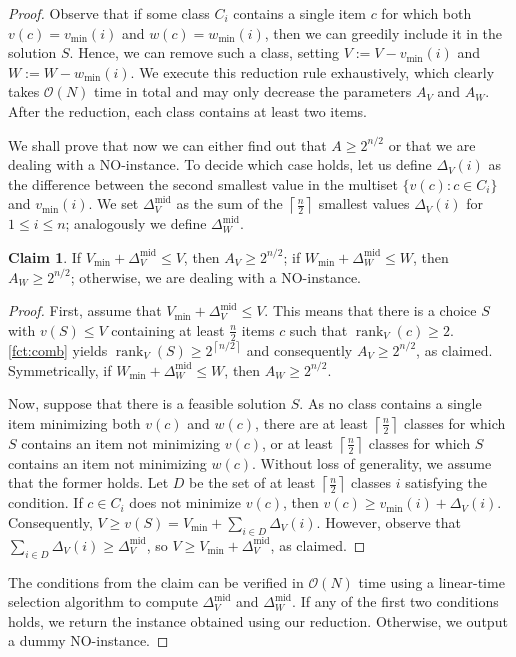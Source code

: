 \documentclass{article}
\theoremstyle{plain}
\theoremstyle{definition}
\newtheorem*{claim}{Claim}
\newcommand{\ceil}[1]{\left\lceil #1 \right\rceil}
\newcommand{\Oh}{\mathcal{O}}
\newcommand{\mmid}{\mathrm{mid}}
\DeclareMathOperator*{\rank}{rank}
\begin{document}
  \begin{proof}   
    Observe that if some class $C_i$ contains a single item $c$ for which both $v(c)=v_{\min}(i)$
    and $w(c)=w_{\min}(i)$, then we can greedily include it in the solution $S$.  
    Hence, we can remove such a class, setting $V := V- v_{\min}(i)$ and $W := W- w_{\min}(i)$.
    We execute this reduction rule exhaustively, which clearly takes $\Oh(N)$ time in total
    and may only decrease the parameters $A_V$ and $A_W$.
    After the reduction, each class contains at least two items.
    
    
    We shall prove that now we can either find out that $A \ge 2^{n/2}$ or 
    that we are dealing with a NO-instance.
    To decide which case holds, let us define $\Delta_V(i)$ as the difference between the second smallest
    value in the multiset $\{v(c) : c\in C_i\}$ and $v_{\min}(i)$.
    We set $\Delta_V^{\mmid}$ as the sum of the $\ceil{\frac{n}{2}}$ smallest values $\Delta_V(i)$
    for $1\le i \le n$; analogously we define $\Delta_W^{\mmid}$.
   
    \begin{claim}
      If $V_{\min} + \Delta_V^{\mmid} \le V$, then $A_V \ge 2^{n/2}$;
      if $W_{\min} + \Delta_W^{\mmid} \le W$, then $A_W \ge 2^{n/2}$;
      otherwise, we are dealing with a NO-instance.
    \end{claim}
    \begin{proof}
      First, assume that $V_{\min} + \Delta_V^{\mmid} \le V$.
      This means that there is a choice $S$ with $v(S)\le V$ containing at least $\frac{n}{2}$ items $c$ such that $\rank_V(c)\ge 2$.
      \cref{fct:comb} yields $\rank_V(S)\ge 2^{\ceil{n/2}}$ and consequently $A_V \ge 2^{n/2}$, as claimed.
      Symmetrically, if $W_{\min} + \Delta_W^{\mmid} \le W$, then $A_W \ge 2^{n/2}$.
   
      Now, suppose that there is a feasible solution $S$.
      As no class contains a single item minimizing both $v(c)$ and $w(c)$, there are at least $\ceil{\frac{n}{2}}$
      classes for which $S$ contains an item not minimizing $v(c)$, or at least $\ceil{\frac{n}{2}}$ classes
      for which $S$ contains an item not minimizing $w(c)$. Without loss of generality, we assume that the former holds.
      Let $D$ be the set of at least $\ceil{\frac{n}{2}}$ classes $i$ satisfying the condition. 
      If $c\in C_i$ does not minimize $v(c)$, then $v(c)\ge v_{\min}(i)+\Delta_V(i)$. 
      Consequently, $V\ge v(S) = V_{\min} + \sum_{i\in D} \Delta_V(i)$. 
      However, observe that $ \sum_{i\in D} \Delta_V(i) \ge \Delta_V^{\mmid}$,
      so $V \ge V_{\min} + \Delta_V^{\mmid}$, as claimed.
    \end{proof}
   
    The conditions from the claim can be verified in $\Oh(N)$ time using a linear-time selection algorithm to compute $\Delta_V^{\mmid}$ and $\Delta_W^{\mmid}$.
    If any of the first two conditions holds, we return the instance obtained using our reduction.
    Otherwise, we output a dummy NO-instance.
  \end{proof}
  
\end{document}
